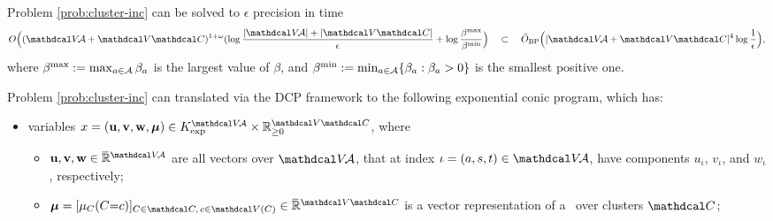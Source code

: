 \begin{subappendices}
\begin{lemma}\label{lem:cluster-inc-polytime}
Problem \eqref{prob:cluster-inc} can be solved to $\epsilon$ precision in time
\[
    O\Big( (\V\!\Ar + \V\C)^{1 + \omega} ( \log \frac{|\V\!\Ar| + |\V\C|}{\epsilon}
        + \log \frac{\beta^{\max}}{\beta^{\min}} \Big)
    \quad \subset \quad
        \tilde O_{\text{BP}}
        \Big( |\V\!\Ar + \V\C|^4 \log \frac1\epsilon \Big),
\]
where $\beta^{\max} := \max_{a \in \mathcal A} \beta_a$ is the largest value of $\beta$,
 and $\beta^{\min}:= \min_{a \in \mathcal A} \{ \beta_a : \beta_a > 0\}$ is the smallest positive one.
\end{lemma}
\begin{lproof}
    Problem \eqref{prob:cluster-inc}
    can translated via the DCP framework to
    the following exponential conic program, which has:
    \begin{itemize}[label=$\blacktriangleright$]
    \item variables
        $x = (\mat u, \mat v, \mat w, \bmu) \in K_{\exp}^{\V\!\Ar} \times \mathbb R_{\ge 0}^{\V \C}$,
        where
        \begin{itemize}[label=\textbullet]
        \item $\mathbf{u, v,w} \in \Rext^{\V\!\Ar}$
            are all vectors over $\V\!\Ar$,
            that at index $\iota = (a,s,t) \in \V\!\Ar$, have
            components $u_\iota$, $v_\iota$, and $w_\iota$, respectively;
        \item
            $\bmu = [\mu_{C}(C{=}c)]_%
            {C \in \C,\,c \in\V(C)}
             \in \Rext^{\V \C}$ is a vector representation of a \actree\ over clusters $\C$;
    \end{itemize}


\end{itemize}
\end{lproof}
\end{subappendices}
